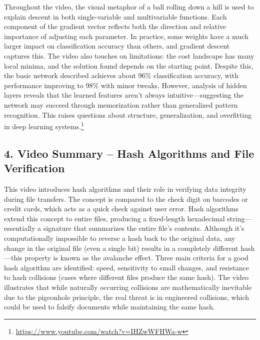 \documentclass{article}
\theoremstyle{theorem}
\theoremstyle{definition}
\theoremstyle{remark}
\begin{document}
Throughout the video, the visual metaphor of a ball rolling down a hill is used to explain descent in both single-variable and multivariable functions. Each component of the gradient vector reflects both the direction and relative importance of adjusting each parameter. In practice, some weights have a much larger impact on classification accuracy than others, and gradient descent captures this. The video also touches on limitations: the cost landscape has many local minima, and the solution found depends on the starting point. Despite this, the basic network described achieves about 96\% classification accuracy, with performance improving to 98\% with minor tweaks. However, analysis of hidden layers reveals that the learned features aren’t always intuitive—suggesting the network may succeed through memorization rather than generalized pattern recognition. This raises questions about structure, generalization, and overfitting in deep learning systems.\footnote{\url{https://www.youtube.com/watch?v=IHZwWFHWa-w}}

\newpage

\subsection*{4. Video Summary – Hash Algorithms and File Verification}

This video introduces hash algorithms and their role in verifying data integrity during file transfers. The concept is compared to the check digit on barcodes or credit cards, which acts as a quick check against user error. Hash algorithms extend this concept to entire files, producing a fixed-length hexadecimal string—essentially a signature that summarizes the entire file’s contents. Although it's computationally impossible to reverse a hash back to the original data, any change in the original file (even a single bit) results in a completely different hash—this property is known as the avalanche effect. Three main criteria for a good hash algorithm are identified: speed, sensitivity to small changes, and resistance to hash collisions (cases where different files produce the same hash). The video illustrates that while naturally occurring collisions are mathematically inevitable due to the pigeonhole principle, the real threat is in engineered collisions, which could be used to falsify documents while maintaining the same hash.
\end{document}
